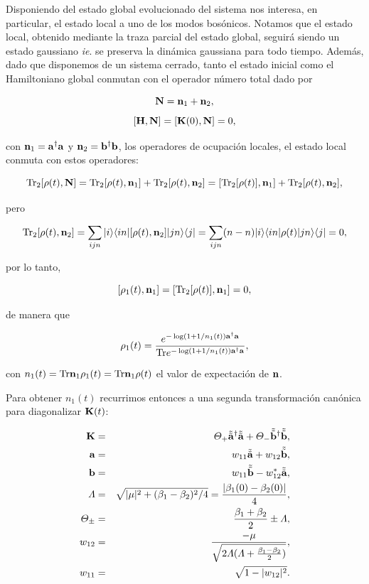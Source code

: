 \documentclass{report} %
\numberwithin{equation}{section}
\begin{document}
Disponiendo del estado global evolucionado del sistema nos interesa, en particular, el estado local a uno de los modos bosónicos. Notamos que el estado local, obtenido mediante la traza parcial del estado global, seguirá siendo un estado gaussiano \textit{ie}. se preserva la dinámica gaussiana para todo tiempo. Además, dado que disponemos de un sistema cerrado,  tanto el estado inicial como el Hamiltoniano global conmutan con el operador número total dado por 

$$
{\bf N}={\bf n}_1+{\bf n}_2,$$
$$
[{\bf H},{\bf N}]=[{\bf K}(0),{\bf N}]=0,
$$

con ${\bf n}_1={\bf a}^\dagger{\bf a}$ y ${\bf n}_2={\mathbf b}^\dagger{\mathbf b}$, los operadores de ocupación locales, el estado local conmuta con estos operadores:

$$
{\Tr}_2 [\rho(t),{\bf N}]={\Tr}_2 [\rho(t),{\bf n}_1] + {\Tr}_2 [\rho(t),{\bf n}_2]=
[{\Tr}_2[\rho(t)],{\bf n}_1] + {\Tr}_2 [\rho(t),{\bf n}_2],
$$

pero

$$
{\Tr}_2 [\rho(t),{\bf n}_2] = \sum_{ijn} |i\rangle\langle in|[\rho(t),{\bf n}_2]|j n \rangle\langle  j|=
\sum_{ijn} (n-n)|i \rangle\langle  in|\rho(t)|j n \rangle\langle  j|=0,
$$

por lo tanto,

$$
[\rho_1(t),{\bf n}_1]=[{\Tr}_2[\rho(t)],{\bf n}_1]=0,
$$

de manera que

$$
\rho_1(t)=\frac{e^{-\log(1+1/n_1(t)){\mathbf a}^\dagger{\mathbf a}}}{{\Tr}e^{-\log(1+1/n_1(t)){\mathbf a}^\dagger{\mathbf a}}},
$$

con $n_1(t)={\Tr }{\bf n}_1\rho_1(t)={\Tr }{\bf n}_1\rho(t)$ el valor de expectación de ${\bf n}$.

Para obtener $n_1(t)$ recurrimos entonces a una segunda transformación canónica para diagonalizar ${\bf K}(t)$:

\begin{eqnarray*}
  {\bf K}&=& \Theta_+ \tilde{\tilde{\mathbf a}}^\dagger\tilde{\tilde{\mathbf a}} +
             \Theta_-
             \tilde{\tilde{\mathbf b}}^\dagger\tilde{\tilde{\mathbf b}},\\  
  {\mathbf a}&=&w_{11}\tilde{\tilde{\mathbf a}}+w_{12}\tilde{\tilde{\mathbf b}},\\
  {\mathbf b}&=&w_{11}\tilde{\tilde{\mathbf b}}-w_{12}^*\tilde{\tilde{\mathbf a}},\\
  \Lambda &=&\sqrt{|\mu|^2 + (\beta_1-\beta_2)^2/4}=\frac{|\beta_1(0)-\beta_2(0)|}{4},\\
  \Theta_{\pm}&=& \frac{\beta_1+\beta_2}{2}\pm  \Lambda,\\
  w_{12} &=& \frac{-\mu}{\sqrt{2 \Lambda(\Lambda + \frac{\beta_1-\beta_2}{2})}},\\
  w_{11} &=&  \sqrt{1-|w_{12}|^2}.
\end{eqnarray*}
\end{document}
